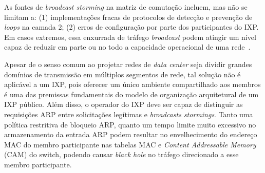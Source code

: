 \documentclass[12pt]{article}
\begin{document}
As fontes de \textit{broadcast storming} na matriz de comutação incluem, mas não se limitam a: (1) implementações fracas de protocolos de detecção e prevenção de \textit{loops} na camada 2; (2) erros de configuração por parte dos participantes do IXP. Em casos extremos, essa enxurrada de tráfego \textit{broadcast} podem atingir um nível capaz de reduzir em parte ou no todo a capacidade operacional de uma rede~\cite{rfc6820}.


Apesar de o senso comum ao projetar redes de \textit{data center} seja dividir grandes domínios de transmissão em múltiplos segmentos de rede, tal solução não é aplicável a um IXP, pois oferecer um único ambiente compartilhado aos membros é uma das premissas fundamentais do modelo de organização arquitetural de um IXP público. Além disso, o operador do IXP deve ser capaz de distinguir as requisições ARP entre solicitações legítimas e \textit{broadcasts stormings}. Tanto uma política restritiva de bloqueio ARP, quanto um tempo limite muito excessivo no armazenamento da entrada ARP podem resultar no envelhecimento do endereço MAC do membro participante nas tabelas MAC e \textit{Content Addressable Memory} (CAM) do switch, podendo causar \textit{black hole} no tráfego direcionado a esse membro participante.

\end{document}
